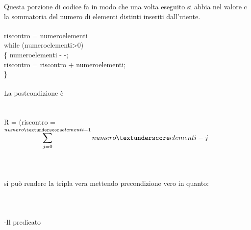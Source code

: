 \documentclass[11pt, a4paper, titlepage, block]{article}
\begin{document}
Questa porzione di codice fa in modo che una volta eseguito si abbia nel valore c la sommatoria del numero di elementi distinti inseriti dall'utente.	
\\
\\
riscontro = numero\textunderscore elementi\\	
while (numero\textunderscore elementi\textgreater 0) \\
\{
numero\textunderscore elementi - -;\\
riscontro = riscontro + numero\textunderscore elementi;\\
\}
\\
\\
La postcondizione \`e 
\\
\\
\\
R = (riscontro = $\displaystyle \sum_{j=0}^{numero\textunderscore elementi-1} numero\textunderscore elementi - j $\\
\\
\\
\\
si pu\`o rendere la tripla vera mettendo precondizione vero in quanto:\\
\\
\\
\\
 -Il predicato
 
\end{document}
